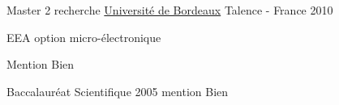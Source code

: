 \begin{cventries}
  \cventry
    {Master 2 recherche} %
    {\href{https://www.u-bordeaux.fr}{Université de Bordeaux}} %
    {Talence - France} %
    {2010} %
    {
      \begin{cvitems} %
        \item {EEA option micro-électronique}
        \item {Mention Bien}
      \end{cvitems}
    }

  \cventry
    {Baccalauréat Scientifique} %
    {} %
    {} %
    {2005} %
    {
      mention Bien
    }
\end{cventries}
